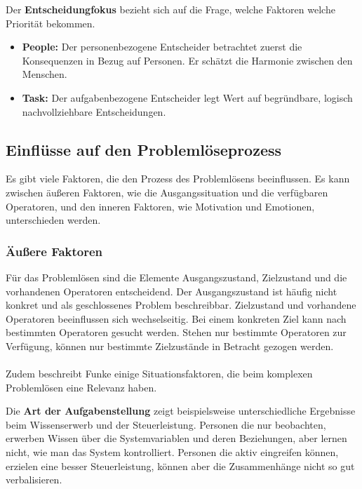 Der \textbf{Entscheidungfokus} bezieht sich auf die Frage, welche Faktoren welche Priorität bekommen.
	\begin{itemize}
	\item \textbf{People:} Der personenbezogene Entscheider betrachtet zuerst die Konsequenzen in Bezug auf Personen. Er schätzt die Harmonie zwischen den Menschen.
	\item \textbf{Task:} Der aufgabenbezogene Entscheider legt Wert auf begründbare, logisch nachvollziehbare Entscheidungen.
	\end{itemize}

\subsection{Einflüsse auf den Problemlöseprozess}
Es gibt viele Faktoren, die den Prozess des Problemlösens beeinflussen. Es kann zwischen äußeren Faktoren, wie die Ausgangssituation und die verfügbaren Operatoren, und den inneren Faktoren, wie Motivation und Emotionen, unterschieden werden.

\subsubsection*{Äußere Faktoren}
Für das Problemlösen sind die Elemente Ausgangszustand, Zielzustand und die vorhandenen Operatoren entscheidend. Der Ausgangszustand ist häufig nicht konkret und als geschlossenes Problem beschreibbar. Zielzustand und vorhandene Operatoren beeinflussen sich wechselseitig. Bei einem konkreten Ziel kann nach bestimmten Operatoren gesucht werden. Stehen nur bestimmte Operatoren zur Verfügung, können nur bestimmte Zielzustände in Betracht gezogen werden. \cite{Funke2015}
\\ \\
Zudem beschreibt Funke \cite{Funke2015} einige Situationsfaktoren, die beim komplexen Problemlösen eine Relevanz haben.

Die \textbf{Art der Aufgabenstellung} zeigt beispielsweise unterschiedliche Ergebnisse beim Wissenserwerb und der Steuerleistung. Personen die nur beobachten, erwerben Wissen über die Systemvariablen und deren Beziehungen, aber lernen nicht, wie man das System kontrolliert. Personen die aktiv eingreifen können, erzielen eine besser Steuerleistung, können aber die Zusammenhänge nicht so gut verbalisieren.

